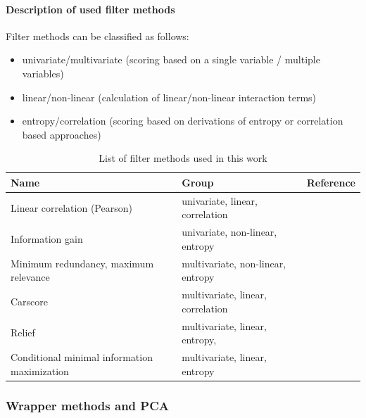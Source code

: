 \documentclass[review]{elsarticle}
\begin{document}
\paragraph{Description of used filter methods}

Filter methods can be classified as follows:

\begin{itemize}
	\item univariate/multivariate (scoring based on a single variable / multiple variables)
	\item linear/non-linear (calculation of linear/non-linear interaction terms)
	\item entropy/correlation (scoring based on derivations of entropy or correlation based approaches)
\end{itemize}

\begin{table}[b!]
\centering
\caption[t]{List of filter methods used in this work}
\begingroup\footnotesize
\begin{tabular}{lll}
	\\
	Name                                         & Group                             & Reference          \\
	\hline
	Linear correlation (Pearson)                 & univariate, linear, correlation   & \cite{pearson1901} \\
	Information gain                             & univariate, non-linear, entropy   & \cite{quinlan1986} \\
	Minimum redundancy, maximum relevance        & multivariate, non-linear, entropy & \cite{zhao2013}    \\
	Carscore                                     & multivariate, linear, correlation & \cite{zuber2011}   \\
	Relief                                       & multivariate, linear, entropy,    & \cite{kira1992}    \\
	Conditional minimal information maximization & multivariate, linear, entropy     & \cite{fleuret2004}
\end{tabular}
\endgroup
\label{tab:filter-methods}
\end{table}

\subsubsection{Wrapper methods and PCA}
\end{document}
